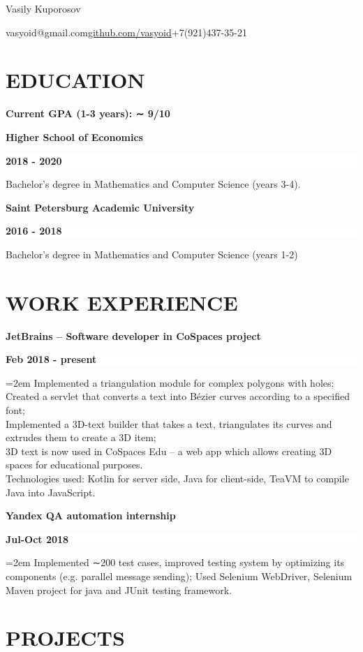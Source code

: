 \documentclass[paper=a4,fontsize=11pt]{scrartcl} %
\newcommand{\MyName}[1]{ %
	\Huge \usefont{OT1}{phv}{b}{n} \begin{center}#1\end{center}
	\par \normalsize \normalfont \vspace*{-1.5em}}
\newcommand{\MySlogan}[1]{ %
	\large \usefont{OT1}{phv}{m}{n} \begin{center}#1\end{center}
	\par \normalsize \normalfont}
\newcommand{\NewPart}[1]{\section*{\uppercase{#1}}}
\newcommand{\EducationEntry}[4]{
	\noindent \textbf{#1} \hfill      %
	\colorbox{White}{%
		\parbox{8em}{%
			\hfill\color{Black}\textbf{#2}}} \par  %
	\small #4 %
	\normalsize \par}
\newcommand{\SomeEntry}[4]{
	\noindent \textbf{#1} \hfill      %
	\colorbox{White}{%
		\parbox{12em}{%
			\hfill\color{Black}\textbf{#2}}} \par  %
	\noindent \texttt{#3} \par        %
	\noindent\hangindent=2em\hangafter=0 \small #4 %
	\normalsize \par}
\begin{document}
	
	\MyName{Vasily Kuporosov}
	\MySlogan{vasyoid@gmail.com\qquad\href{http://github.com/vasyoid}{github.com/vasyoid}\qquad+7(921)437-35-21}
		
	\NewPart{Education}
	
	\EducationEntry{Current GPA (1-3 years): ∼ 9/10}{}{}{}
	
\EducationEntry{Higher School of Economics}{2018 - 2020}{}{Bachelor's degree in Mathematics and Computer Science (years 3-4).}
	
	\EducationEntry{Saint Petersburg Academic University}{2016 - 2018}{}{Bachelor’s degree in Mathematics and Computer Science (years 1-2) }
	
	\NewPart{Work Experience}
	
	\SomeEntry{JetBrains – Software developer in CoSpaces project}{Feb 2018 - present}{\vspace{-10pt}}{Implemented a triangulation module for complex polygons with holes;\\
		Created a servlet that converts a text into Bézier curves according to a specified font;\\
		Implemented a 3D-text builder that takes a text, triangulates its curves and extrudes them to create a 3D item;\\
		3D text is now used in CoSpaces Edu – a web app which allows creating 3D spaces for educational purposes.\\
		Technologies used: Kotlin for server side, Java for client-side, TeaVM to compile Java into JavaScript.}
	
	\SomeEntry{Yandex QA automation internship}{Jul-Oct 2018}{\vspace{-10pt}}{Implemented ∼200 test cases, improved testing system by optimizing its components (e.g. parallel message sending);
		Used Selenium WebDriver, Selenium Maven project for java and JUnit testing framework.}
	
	\NewPart{Projects}
	
\end{document}
